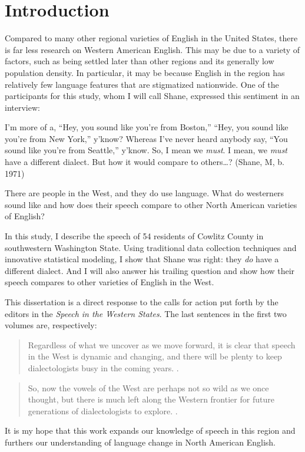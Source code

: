 \chapter{Introduction}
\label{ch:introduction}


Compared to many other regional varieties of English in the United States, there is far less research on Western American English. This may be due to a variety of factors, such as being settled later than other regions and its generally low population density. In particular, it may be because English in the region has relatively few language features that are stigmatized nationwide. One of the participants for this study, whom I will call Shane, expressed this sentiment in an interview:
\begin{num_quote}
    I'm more of a, ``Hey, you sound like you're from Boston,'' ``Hey, you sound like you're from New York,'' y'know? Whereas I've never heard anybody say, ``You sound like you're from Seattle,'' y'know. So, I mean we \textit{must}. I mean, we \textit{must} have a different dialect. But how it would compare to others\ldots? (Shane, M, b. 1971)
\end{num_quote}
There are people in the West, and they do use language. What do westerners sound like and how does their speech compare to other North American varieties of English?

In this study, I describe the speech of 54 residents of Cowlitz County in southwestern Washington State. Using traditional data collection techniques and innovative statistical modeling, I show that Shane was right: they \textit{do} have a different dialect. And I will also answer his trailing question and show how their speech compares to other varieties of English in the West.

This dissertation is a direct response to the calls for action put forth by the editors in the \textit{Speech in the Western States}. The last sentences in the first two volumes are, respectively:
\begin{quote}
    Regardless of what we uncover as we move forward, it is clear that speech in the West is dynamic and changing, and there will be plenty to keep dialectologists busy in the coming years. \citep[164]{fridland_etal_2016_pads}.
\end{quote}
\begin{quote}
    So, now the vowels of the West are perhaps not so wild as we once thought, but there is much left along the Western frontier for future generations of dialectologists to explore. \citep[173]{fridland_etal_2017_pads}.
\end{quote}
It is my hope that this work expands our knowledge of speech in this region and furthers our understanding of language change in North American English.


